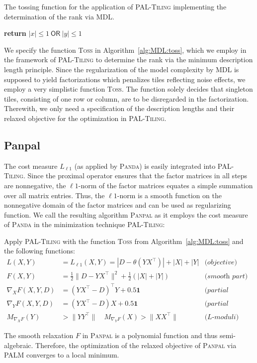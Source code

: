 \begin{algorithm}[t]
\caption{The tossing function for the application of \textsc{PAL-Tiling} implementing the determination of the rank via MDL.} 
\begin{algorithmic}[1]
  	\State \textbf{return} $|x|\leq 1\ \mathsf{OR}\ |y|\leq 1$ 
  \EndFunction
\end{algorithmic}
\label{alg:MDL:toss}
\end{algorithm}
We specify the function \textsc{Toss} in Algorithm~\ref{alg:MDL:toss}, which we employ in the framework of \textsc{PAL-Tiling} to determine the rank via the minimum description length principle. Since the regularization of the model complexity by MDL is supposed to yield factorizations which penalizes tiles reflecting noise effects, we employ a very simplistic function \textsc{Toss}. The function solely decides that singleton tiles, consisting of one row or column, are to be disregarded in the factorization. Therewith, we only need a specification of the description lengths and their relaxed objective for the optimization in \textsc{PAL-Tiling}.
\subsection{Panpal}\label{sec:MDL:panpal}
The cost measure $L_{\ell 1}$ (as applied by \textsc{Panda}) is easily  integrated into \textsc{PAL-Tiling}. Since the proximal operator ensures that the factor matrices in all steps are nonnegative, the $\ell 1$-norm of the factor matrices equates a simple summation over all matrix entries. Thus, the $\ell 1$-norm is a smooth function on the nonnegative domain of the factor matrices and can be used as regularizing function. We call the resulting algorithm \textsc{Panpal} as it employs the cost measure of \textsc{Panda} in the minimization technique \textsc{PAL-Tiling}:
\begin{algSpec}[Panpal] \label{algSpec:panpal}
Apply \textsc{PAL-Tiling} with the function \textsc{Toss} from Algorithm~\ref{alg:MDL:toss} and the following functions:
\begin{align*}
    L(X,Y)&=L_{\ell 1}(X,Y) = |D-\theta(YX^\top )|+|X|+|Y| & \textit{(objective)}\\
    F(X,Y)&=\frac{1}{2}\|D-YX^\top \|^2+ \frac{1}{2}(|X|+|Y|) & \textit{(smooth part)}\\
    \nabla_XF(X,Y,D)&=(YX^\top -D)^\top Y+0.5\mathbf{1}& \textit{(partial gradient X)}\\
\nabla_YF(X,Y,D)&=(YX^\top -D)X+0.5\mathbf{1} & \textit{(partial gradient Y)}\\
M_{\nabla_XF}(Y)&>\|YY^\top \| \quad M_{\nabla_YF}(X)>\|XX^\top \| & \textit{(L-moduli)}
\end{align*}
\end{algSpec}
The smooth relaxation $F$ in \textsc{Panpal} is a polynomial function and thus semi-algebraic. Therefore, the optimization of the relaxed objective of \textsc{Panpal} via PALM converges to a local minimum.
